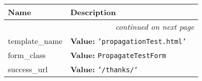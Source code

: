     \vspace{-1cm}
\hspace{\varindent}\begin{longtable}{|p{\varnamewidth}|p{\vardescrwidth}|l}
\cline{1-2}
\cline{1-2} \centering \textbf{Name} & \centering \textbf{Description}& \\
\cline{1-2}
\endhead\cline{1-2}\multicolumn{3}{r}{\small\textit{continued on next page}}\\\endfoot\cline{1-2}
\endlastfoot\raggedright t\-e\-m\-p\-l\-a\-t\-e\-\_\-n\-a\-m\-e\- & \raggedright \textbf{Value:} 
{\tt 'propagationTest.html'}&\\
\cline{1-2}
\raggedright f\-o\-r\-m\-\_\-c\-l\-a\-s\-s\- & \raggedright \textbf{Value:} 
{\tt PropagateTestForm}&\\
\cline{1-2}
\raggedright s\-u\-c\-c\-e\-s\-s\-\_\-u\-r\-l\- & \raggedright \textbf{Value:} 
{\tt '/thanks/'}&\\
\cline{1-2}
\end{longtable}

